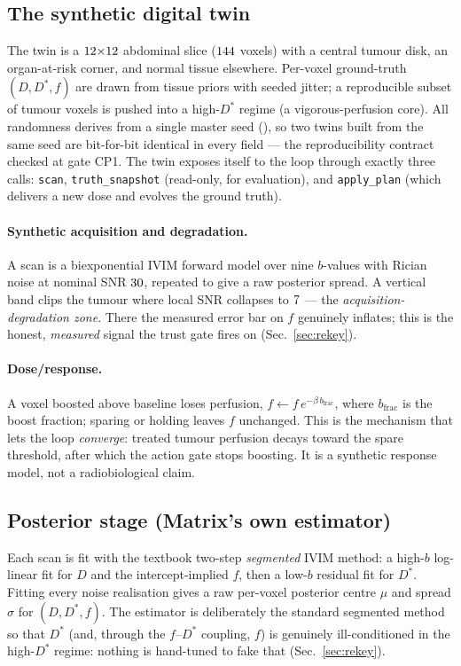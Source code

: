\documentclass[12pt]{iopart}
\newcommand{\Dstar}{D^{*}}
\newcommand{\fq}{f}          %
\begin{document}
\subsection{The synthetic digital twin}
The twin is a $12{\times}12$ abdominal slice ($144$ voxels) with a central
tumour disk, an organ-at-risk corner, and normal tissue elsewhere. Per-voxel ground-truth
$(D,\Dstar,\fq)$ are drawn from tissue priors with seeded jitter; a reproducible subset of
tumour voxels is pushed into a high-$\Dstar$ regime (a vigorous-perfusion core). All
randomness derives from a single master seed (\numSeed), so two twins built from the same
seed are bit-for-bit identical in every field --- the reproducibility contract checked at
gate CP1. The twin exposes itself to the loop through exactly three calls: \texttt{scan},
\texttt{truth\_snapshot} (read-only, for evaluation), and \texttt{apply\_plan} (which
delivers a new dose and evolves the ground truth).

\paragraph{Synthetic acquisition and degradation.} A scan is a biexponential IVIM
forward model over nine $b$-values with Rician noise at nominal SNR $30$, repeated
to give a raw posterior spread. A vertical band clips the tumour where local SNR collapses
to $7$ --- the \emph{acquisition-degradation zone}. There the measured error bar
on $\fq$ genuinely inflates; this is the honest, \emph{measured} signal the trust gate
fires on (Sec.~\ref{sec:rekey}).

\paragraph{Dose/response.} A voxel boosted above baseline loses perfusion,
$\fq \leftarrow \fq \, e^{-\beta\, b_{\mathrm{frac}}}$, where $b_{\mathrm{frac}}$ is the
boost fraction; sparing or holding leaves $\fq$ unchanged. This is the mechanism that
lets the loop \emph{converge}: treated tumour perfusion decays toward the spare threshold,
after which the action gate stops boosting. It is a synthetic response model, not a
radiobiological claim.

\subsection{Posterior stage (Matrix's own estimator)}
Each scan is fit with the textbook two-step \emph{segmented} IVIM method: a high-$b$
log-linear fit for $D$ and the intercept-implied $\fq$, then a low-$b$ residual fit for
$\Dstar$. Fitting every noise realisation gives a raw per-voxel posterior centre $\mu$ and
spread $\sigma$ for $(D,\Dstar,\fq)$. The estimator is deliberately the standard segmented
method so that $\Dstar$ (and, through the $\fq$--$\Dstar$ coupling, $\fq$) is genuinely
ill-conditioned in the high-$\Dstar$ regime: nothing is hand-tuned to fake that
(Sec.~\ref{sec:rekey}).
\end{document}

